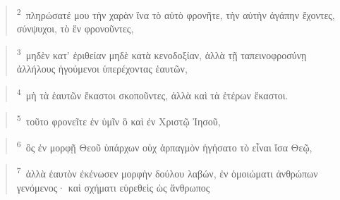\documentclass{article}
\newcommand{\currentverse}{1} %
\newcommand{\setcurrentverse}[1]{\renewcommand{\currentverse}{#1}}
\begin{document}
\begin{verse}

\setcurrentverse{2}

\setcounter{footnote}{0}

\textsuperscript{2}~πληρώσατέ μου τὴν χαρὰν ἵνα τὸ αὐτὸ φρονῆτε, τὴν αὐτὴν ἀγάπην ἔχοντες, σύνψυχοι, τὸ ἓν φρονοῦντες,

\end{verse}

\begin{verse}

\setcurrentverse{3}

\setcounter{footnote}{0}

\textsuperscript{3}~μηδὲν κατ’ ἐριθείαν μηδὲ κατὰ κενοδοξίαν, ἀλλὰ τῇ ταπεινοφροσύνῃ ἀλλήλους ἡγούμενοι ὑπερέχοντας ἑαυτῶν,

\end{verse}

\begin{verse}

\setcurrentverse{4}

\setcounter{footnote}{0}

\textsuperscript{4}~μὴ τὰ ἑαυτῶν ἕκαστοι σκοποῦντες, ἀλλὰ καὶ τὰ ἑτέρων ἕκαστοι.

\end{verse}

\begin{verse}

\setcurrentverse{5}

\setcounter{footnote}{0}

\textsuperscript{5}~τοῦτο φρονεῖτε ἐν ὑμῖν ὃ καὶ ἐν Χριστῷ Ἰησοῦ,

\end{verse}

\begin{verse}

\setcurrentverse{6}

\setcounter{footnote}{0}

\textsuperscript{6}~ὃς ἐν μορφῇ Θεοῦ ὑπάρχων οὐχ ἁρπαγμὸν ἡγήσατο τὸ εἶναι ἴσα Θεῷ,

\end{verse}

\begin{verse}

\setcurrentverse{7}

\setcounter{footnote}{0}

\textsuperscript{7}~ἀλλὰ ἑαυτὸν ἐκένωσεν μορφὴν δούλου λαβών, ἐν ὁμοιώματι ἀνθρώπων γενόμενος· καὶ σχήματι εὑρεθεὶς ὡς ἄνθρωπος

\end{verse}
\end{document}
